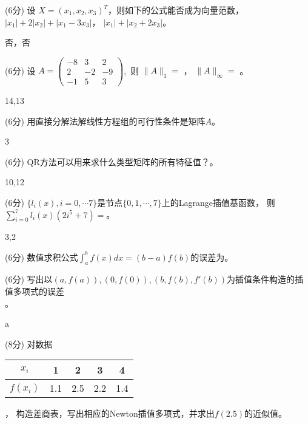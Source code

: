 \documentclass[12pt,letter]{ustcexam}
\def\ds{\displaystyle}
\begin{document}
\begin{problems}
\qu (6分) 设 $X=(x_1,x_2,x_3)^T$，则如下的公式能否成为向量范数， \\
$|x_1|+2|x_2|+|x_1-3x_3|$\twob\oneb ，
$|x_1|+|x_2+2x_3|$\twob\oneb 。
\begin{sol}
 否，否
\end{sol}

\question (6分) 设 $ \ds{A=\begin {pmatrix} -8 & 3 & 2 \\
2 & -2 & -9 \\ -1 & 5 & 3 \end {pmatrix}}$,\  则 $ \|A\|_1=$ \sixb ，
$ \|A\|_\infty =$ \sixb 。
\begin{sol}
14,13
\end{sol}

\qu (6分) 用直接分解法解线性方程组的可行性条件是矩阵$A$\tenb\fourb。
\begin{sol}
3  
\end{sol}

\question (6分) QR方法可以用来求什么类型矩阵的所有特征值？\fourb\fourb 。
\begin{sol}
10,12
\end{sol}

\qu (6分) $\{l_i(x),i=0,\cdots 7\}$是节点$\{0,1,\cdots,7\}$上的Lagrange插值基函数，
则$\sum_{i=0}^7l_i(x)(2 i^5+7)=$\twob\fourb。
\begin{sol}
3,2
\end{sol}

\qu (6分) 数值求积公式$ \int_a^b f(x) dx=(b-a)f\left(b\right) $的误差为\tenb。

\qu (6分) 写出以$(a,f(a)),(0,f(0)),(b,f(b),f'(b))$为插值条件构造的插值多项式的误差\\ \sixb\sixb\tenb 。
\begin{sol}
a
\end{sol}

\newpage
{}
\qu (8分) 对数据 
\begin{tabular}{c|cccc} $x_i$  & 1 & 2 & 3 & 4
\\\hline $f(x_i)$ & 1.1 & 2.5 & 2.2 & 1.4
\end{tabular} ，
构造差商表，写出相应的Newton插值多项式，并求出$f(2.5)$的近似值。

\vspace*{0.4\textheight}




\end{problems}
\end{document}

